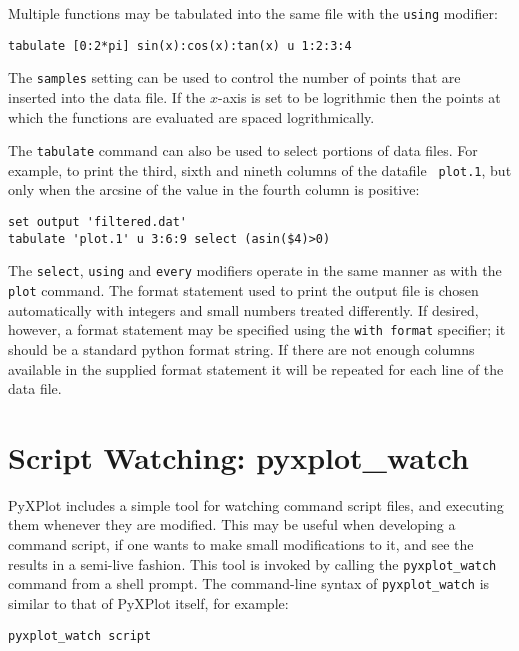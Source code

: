 Multiple functions may be tabulated into the same file with the {\tt using}
modifier:

\begin{verbatim}
tabulate [0:2*pi] sin(x):cos(x):tan(x) u 1:2:3:4
\end{verbatim}

The {\tt samples} setting can be used to control the number of points that are
inserted into the data file.  If the $x$-axis is set to be logrithmic then the
points at which the functions are evaluated are spaced logrithmically.

The {\tt tabulate} command can also be used to select portions of data files.
For example, to print the third, sixth and nineth columns of the datafile {\tt
plot.1}, but only when the arcsine of the value in the fourth column is
positive:

\begin{verbatim}
set output 'filtered.dat'
tabulate 'plot.1' u 3:6:9 select (asin($4)>0)
\end{verbatim}

\noindent The {\tt select}, {\tt using} and {\tt every} modifiers operate in the
same manner as with the {\tt plot} command.  The format statement used to print
the output file is chosen automatically with integers and small numbers treated
differently.  If desired, however, a format statement may be specified using the
{\tt with format} specifier; it should be a standard python format string.  If
there are not enough columns available in the supplied format statement it will
be repeated for each line of the data file.

\section{Script Watching: pyxplot\_watch}

PyXPlot includes a simple tool for watching command script files, and executing
them whenever they are modified. This may be useful when developing a command
script, if one wants to make small modifications to it, and see the results in
a semi-live fashion. This tool is invoked by calling the
\texttt{pyxplot\_watch} command
from a shell prompt. The command-line syntax of \texttt{pyxplot\_watch} is
similar to that of PyXPlot itself, for example:

\begin{verbatim}
pyxplot_watch script
\end{verbatim}

